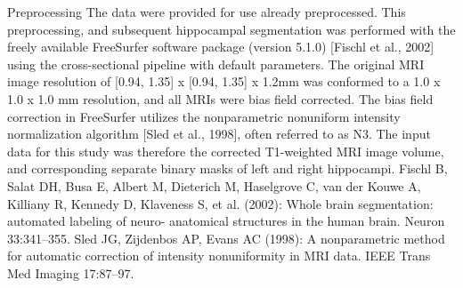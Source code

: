 Preprocessing
The data were provided for use already preprocessed. This preprocessing, and subsequent hippocampal segmentation was performed with the freely available FreeSurfer software package (version 5.1.0) [Fischl et al., 2002] using the cross-sectional pipeline with default parameters. The original MRI image resolution of [0.94, 1.35] x [0.94, 1.35] x 1.2mm was conformed to a 1.0 x 1.0 x 1.0 mm resolution, and all MRIs were bias field corrected. The bias field correction in FreeSurfer utilizes the nonparametric nonuniform intensity normalization algorithm [Sled et al., 1998], often referred to as N3. The input data for this study was therefore the corrected T1-weighted MRI image volume, and corresponding separate binary masks of left and right hippocampi.
Fischl B, Salat DH, Busa E, Albert M, Dieterich M, Haselgrove C, van der Kouwe A, Killiany R, Kennedy D, Klaveness S, et al. (2002): Whole brain segmentation: automated labeling of neuro- anatomical structures in the human brain. Neuron 33:341–355.
Sled JG, Zijdenbos AP, Evans AC (1998): A nonparametric method for automatic correction of intensity nonuniformity in MRI data. IEEE Trans Med Imaging 17:87–97.